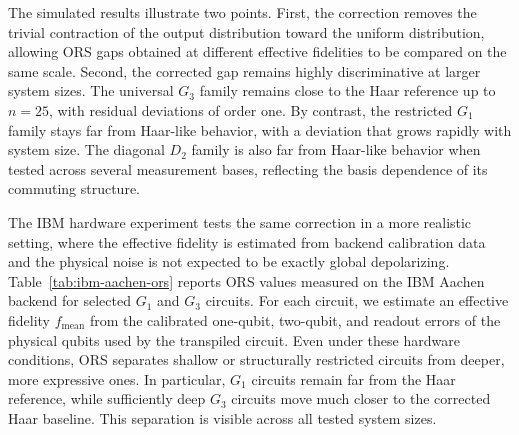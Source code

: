 \documentclass[
    aps,
    pre,
    amsmath,
    amssymb,
    reprint,
    superscriptaddress,
    preprintnumbers,
]{revtex4-2}
\begin{document}
The simulated results illustrate two points. First, the correction removes the trivial contraction of the output distribution toward the uniform distribution, allowing ORS gaps obtained at different effective fidelities to be compared on the same scale. Second, the corrected gap remains highly discriminative at larger system sizes. The universal $G_3$ family remains close to the Haar reference up to $n=25$, with residual deviations of order one. By contrast, the restricted $G_1$ family stays far from Haar-like behavior, with a deviation that grows rapidly with system size. The diagonal $D_2$ family is also far from Haar-like behavior when tested across several measurement bases, reflecting the basis dependence of its commuting structure. 

The IBM hardware experiment tests the same correction in a more realistic setting, where the effective fidelity is estimated from backend calibration data and the physical noise is not expected to be exactly global depolarizing. Table~\ref{tab:ibm-aachen-ors} reports ORS values measured on the IBM Aachen backend for selected $G_1$ and $G_3$ circuits. For each circuit, we estimate an effective fidelity $f_{\mathrm{mean}}$ from the calibrated one-qubit, two-qubit, and readout errors of the physical qubits used by the transpiled circuit. Even under these hardware conditions, ORS separates shallow or structurally restricted circuits from deeper, more expressive ones. In particular, $G_1$ circuits remain far from the Haar reference, while sufficiently deep $G_3$ circuits move much closer to the corrected Haar baseline. This separation is visible across all tested system sizes.
\end{document}
